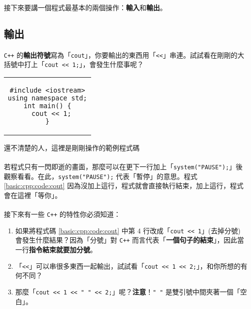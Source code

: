 \documentclass[12pt,a4paper,oneside]{report}
\begin{document}
\begin{CJK}{UTF8}{bkai}
\paragraph{}接下來要講一個程式最基本的兩個操作：\textbf{輸入}和\textbf{輸出}。

\subsection{輸出}

\paragraph{}\texttt{C++} 的\textbf{輸出符號}寫為「\lstinline!cout!」，你要輸出的東西用「\lstinline!<<!」串連。試試看在剛剛的大括號中打上「\lstinline!cout << 1;!」，會發生什麼事呢？

\begin{code}[h!]
\centering
\begin{tabular}{c}
\begin{lstlisting}
#include <iostream>
using namespace std;
int main() {
  cout << 1;
}
\end{lstlisting}
\end{tabular}
\caption{還不清楚的人，這裡是剛剛操作的範例程式碼}
\label{basic:cpp:code:cout}
\end{code}

\paragraph{}若程式只有一閃即逝的畫面，那麼可以在更下一行加上「\lstinline!system("PAUSE");!」後觀察看看。在此，\lstinline!system("PAUSE");! 代表「暫停」的意思。程式 \ref{basic:cpp:code:cout} 因為沒加上這行，程式就會直接執行結束，加上這行，程式會在這裡「等你」。
\paragraph{}接下來有一些 \texttt{C++} 的特性你必須知道：

\begin{enumerate}
\item 如果將程式碼 \ref{basic:cpp:code:cout} 中第 4 行改成「\lstinline!cout << 1!」(去掉分號) 會發生什麼結果？因為「分號」對 \texttt{C++} 而言代表「\textbf{一個句子的結束}」，因此當一行\textbf{指令結束就要加分號}。
\item 「\lstinline!<<!」可以串很多東西一起輸出，試試看「\lstinline!cout << 1 << 2;!」，和你所想的有何不同？
\item 那麼「\lstinline!cout << 1 << " " << 2;!」呢？{\color{blue}\textbf{注意}}！\lstinline!" "! 是雙引號中間夾著一個「空白」。
\end{enumerate}


\end{CJK}
\end{document}
